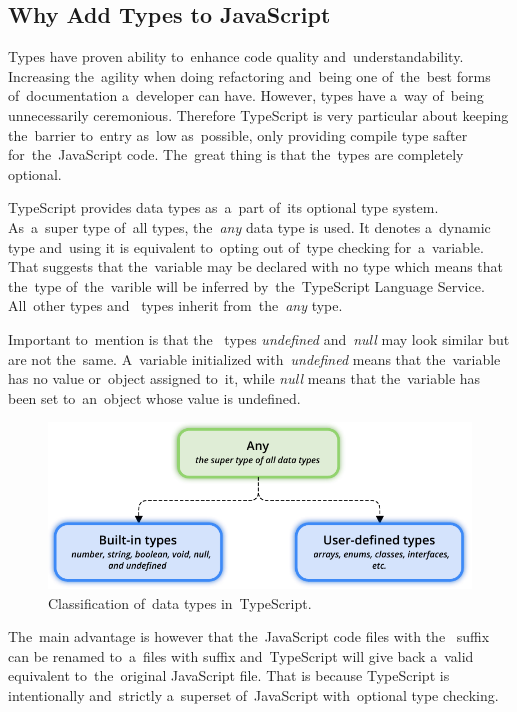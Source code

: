 \subsection{Why Add Types to JavaScript}
Types have proven ability to~enhance code quality and~understandability.
Increasing the~agility when doing refactoring and~being one of~the~best forms
of~documentation a~developer can have. However, types have a~way of~being
unnecessarily ceremonious. Therefore TypeScript is very particular about keeping
the~barrier to~entry as~low as~possible, only providing compile type safter
for~the~JavaScript code. The~great thing is that the~types are completely
optional.

TypeScript provides data types as~a~part of~its optional type system. As~a~super
type of~all types, the~\textit{any} data type is used. It denotes a~dynamic type
and~using it is equivalent to~opting out of~type checking for~a~variable. That
suggests that the~variable may be declared with no type which means that
the~type of~the~varible will be inferred by~the~TypeScript Language Service.
All~other  types and~ types inherit
from~the~\textit{any} type.

Important to~mention is that the~ types \textit{undefined}
and~\textit{null} may look similar but are not the~same. A~variable initialized
with~\textit{undefined} means that the~variable has no value or~object assigned
to~it, while \textit{null} means that the~variable has been set to~an~object
whose value is undefined.

\begin{figure}[!hbt]
	\centering
	\includegraphics[scale=0.8]{./figures/data-types.pdf}
	\caption{Classification of~data types in~TypeScript.}
	\label{fig-datatypes}
\end{figure}

The~main advantage is however that the~JavaScript code files with the~
suffix can be renamed to~a~files with  suffix and~TypeScript will give
back a~valid equivalent to~the~original JavaScript file. That is because
TypeScript is intentionally and~strictly a~superset of~JavaScript with~optional
type checking.



